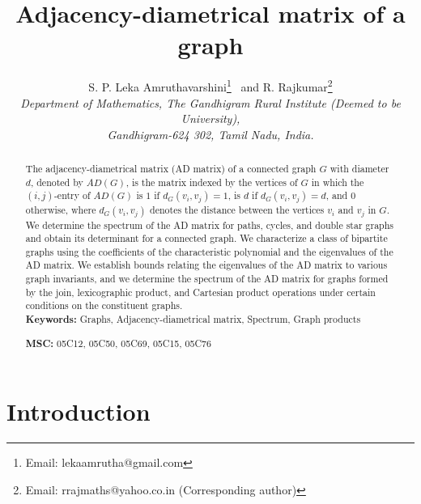\documentclass[12pt]{article}
\numberwithin{equation}{section}
\begin{document}
	\vspace{-2cm}
	\title{\LARGE\bf Adjacency-diametrical matrix of a graph}
	\author { S. P. Leka Amruthavarshini\footnote{Email: lekaamrutha@gmail.com}~ and  R. Rajkumar\footnote{Email: rrajmaths@yahoo.co.in (Corresponding author)} 
		\\ \small \it Department of Mathematics,
		\small \it The Gandhigram Rural Institute (Deemed to be University),\\
		\small \it Gandhigram-624 302, Tamil Nadu, India.
	}
	
	
	\date{}
	\maketitle
	\begin{abstract}
		The adjacency-diametrical matrix (AD matrix) of a connected graph $G$ with diameter $d$, denoted by $AD(G)$, is the matrix indexed by the vertices of $G$ in which the $(i,j)$-entry of $AD(G)$ is $1$ if $d_G(v_i,v_j)=1$, is  $d$ if $d_G(v_i,v_j)=d$, and $0$ otherwise, where $d_G(v_i,v_j)$ denotes the distance between the vertices $v_i$ and $v_j$ in $G$. We determine the spectrum of the AD matrix for paths, cycles, and double star graphs and obtain its determinant for a connected graph. We characterize a class of bipartite graphs using the coefficients of the characteristic polynomial and the eigenvalues of the AD matrix. We establish bounds relating the eigenvalues of the AD matrix to various graph invariants, and we determine the spectrum of the AD matrix for graphs formed by the join, lexicographic product, and Cartesian product operations under certain conditions on the constituent graphs.\\
		
			
		\noindent	\textbf{Keywords:} Graphs, Adjacency-diametrical matrix, Spectrum, Graph products
		
		\noindent	\textbf{MSC:} 05C12, 05C50, 05C69, 05C15, 05C76
		
	\end{abstract}
	
	\section{Introduction}
\end{document}
